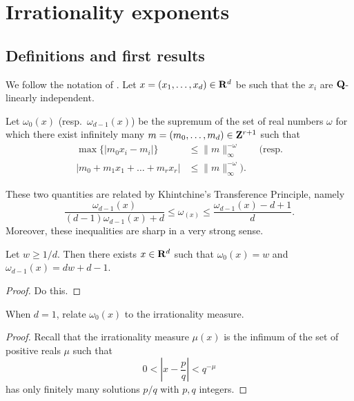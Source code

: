 
\chapter{Irrationality exponents}\label{chapter:irrationality-exponent}





\section{Definitions and first results}

We follow the notation of \cite{laurent-2009}. Let 
$x=(x_1,\dots,x_d)\in \mathbf{R}^d$ be such that the $x_i$ are $\mathbf{Q}$-linearly 
independent. 

\begin{definition}\label{def:approx-exp}
Let $\omega_0(x)$ (resp.~$\omega_{d-1}(x)$) be the supremum of the set of real 
numbers $\omega$ for which there exist infinitely many 
$m=(m_0,\dots,m_d)\in \mathbf{Z}^{r+1}$ such that 
\begin{align*}
	\max\{|m_0 x_i - m_i|\} 
		&\leqslant \|m\|_\infty^{-\omega}  \qquad\text{(resp.} \\
	|m_0 + m_1 x_1 + \dots + m_r x_r| 
		&\leqslant \|m\|_\infty^{-\omega} \text{).}
\end{align*}
\end{definition}

These two quantities are related by Khintchine's Transference Principle, namely 
\[
	\frac{\omega_{d-1}(x)}{(d-1) \omega_{d-1}(x)+d} \leqslant \omega_(x) \leqslant \frac{\omega_{d-1}(x)-d+1}{d} .
\]
Moreover, these inequalities are sharp in a very strong sense. 

\begin{theorem}[Jarn\'ik]\label{thm:jarnik}
Let $w\geqslant 1/d$. Then there exists $x\in \mathbf{R}^d$ such that $\omega_0(x)=w$ 
and $\omega_{d-1}(x) = d w+d-1$. 
\end{theorem}
\begin{proof}
Do this. 
\end{proof}

\begin{theorem}
When $d=1$, relate $\omega_0(x)$ to the irrationality measure. 
\end{theorem}
\begin{proof}
Recall that the irrationality measure $\mu(x)$ is the infimum of the set of 
positive reals $\mu$ such that 
\[
	0 < \left| x - \frac p q\right| < q^{-\mu} 
\]
has only finitely many solutions $p/q$ with $p,q$ integers. 
\end{proof}

